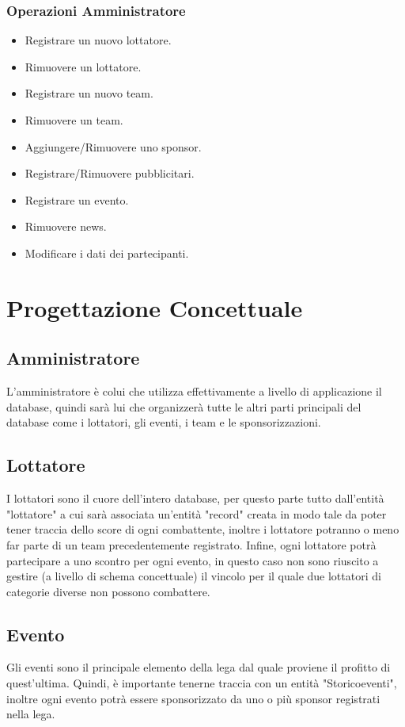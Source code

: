 \documentclass[a4paper,12pt]{report}
\begin{document}
\subsection{Operazioni Amministratore}
\begin{itemize}
    \item Registrare un nuovo lottatore.
    \item Rimuovere un lottatore.
    \item Registrare un nuovo team.
    \item Rimuovere un team.
    \item Aggiungere/Rimuovere uno sponsor.
    \item Registrare/Rimuovere pubblicitari.
    \item Registrare un evento.
    \item Rimuovere news.
    \item Modificare i dati dei partecipanti.
\end{itemize}

\chapter{Progettazione Concettuale}
\section{Amministratore}
L'amministratore è colui che utilizza effettivamente a livello di applicazione il database, quindi sarà lui che organizzerà tutte  
le altri parti principali del database come i lottatori, gli eventi, i team e le sponsorizzazioni.

\section{Lottatore}
I lottatori sono il cuore dell'intero database, per questo parte tutto dall'entità "lottatore" a cui sarà associata un'entità 
"record" creata in modo tale da poter tener traccia dello score di ogni combattente, inoltre i lottatore potranno o meno far parte 
di un team precedentemente registrato. Infine, ogni lottatore potrà partecipare a uno scontro per ogni evento, 
in questo caso non sono riuscito a gestire (a livello di schema concettuale) il vincolo per il quale due lottatori 
di categorie diverse non possono combattere.

\section{Evento}
Gli eventi sono il principale elemento della lega dal quale proviene il profitto di quest'ultima. Quindi, è importante 
tenerne traccia con un entità "Storico\textunderscore eventi", inoltre ogni evento potrà essere sponsorizzato da uno o più sponsor registrati nella lega.
\end{document}
